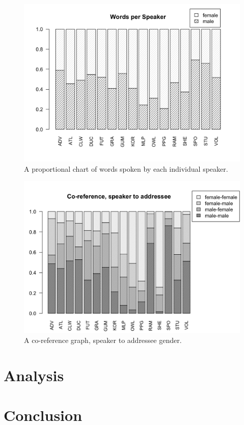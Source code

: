\documentclass[a4paper, 11pt]{article}
\begin{document}
\begin{figure}[t!]
  \includegraphics[width=\linewidth]{figures/worperspk.png}
  \caption{A proportional chart of words spoken by each individual speaker.}
  \label{fig:worperspk}
\end{figure}

\begin{figure}[t!]
  \includegraphics[width=\linewidth]{figures/coreference.png}
  \caption{A co-reference graph, speaker to addressee gender.}
  \label{fig:coreference}
\end{figure}

\section{Analysis}

\section{Conclusion}



\end{document}

